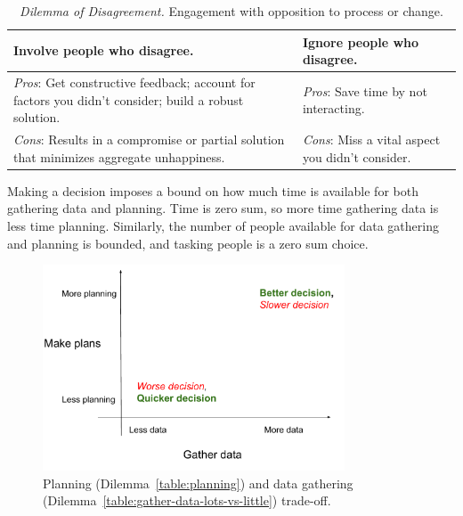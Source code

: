 \begin{center}
\begin{table}[H]
\begin{tabular}{ | m{\dilemmatablewidth}| m{\dilemmatablewidth} | } 
  \hline
  \textbf{Involve people who disagree.} & 
  \textbf{Ignore people who disagree.} \\ 
  \hline
  \textit{Pros}: Get constructive feedback; account for factors you didn't consider; build a robust solution. & 
  \textit{Pros}: Save time by not interacting. \\  
  \hline
  \textit{Cons}: Results in a compromise or partial solution that minimizes aggregate unhappiness. & 
  \textit{Cons}: Miss a vital aspect you didn't consider. \\  
  \hline
\end{tabular}
\caption{\textit{Dilemma of Disagreement.}
Engagement with opposition to process or change.
}
\label{table:opposition}
\end{table}
\end{center}

Making a decision imposes a bound on how much time is available for both gathering data and planning. Time is zero sum, so more time gathering data is less time planning. Similarly, the number of people available for data gathering and planning is bounded, and tasking people is a zero sum choice.

\begin{figure}[H] %
    \centering
    \includegraphics[width=0.8\textwidth]{images/planning_and_data_gathering.pdf}
    \caption{Planning (Dilemma~\ref{table:planning}) and data gathering (Dilemma~\ref{table:gather-data-lots-vs-little}) trade-off.}
    \label{fig:pareto_frontier}
\end{figure}

